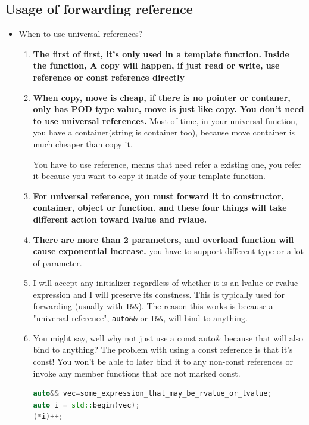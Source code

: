 \documentclass[a4paper,11pt,twoside]{book}
\begin{document}
\subsection{Usage of forwarding reference}
\begin{itemize}
\item When to use universal references? 
	\begin{enumerate}
		\item \textbf{The first of first, it's only used in a template function.}  \textbf{Inside the function, A copy will happen, if just read or write, use reference or const reference directly}
		
		\item \textbf{When copy, move is cheap, if there is no pointer or contaner, only has POD type value, move is just like copy. You don't need to use universal references.} Most of time, in your universal function, you have a container(string is container too), because move container is much cheaper than copy it. 
		
		You have to use reference, means that need refer a existing one, you refer it because you want to copy it inside of your template function. 
		
		\item \textbf{For universal reference, you must forward it to constructor, container, object or function. and these four things will take different action toward lvalue and rvlaue.}
		
		\item \textbf{There are more than 2 parameters, and overload function will cause exponential increase.} you have to support different type or a lot of parameter. 

		\item I will accept any initializer regardless of whether it is an lvalue or rvalue expression and I will preserve its constness.  This is typically used for forwarding (usually with \texttt{T\&\&}). The reason this works is because a "universal reference", \texttt{auto\&\&} or \texttt{T\&\&}, will bind to anything.  

		\item You might say, well why not just use a const auto\& because that will also bind to anything? The problem with using a const reference is that it's const! You won't be able to later bind it to any non-const references or invoke any member functions that are not marked const.
\begin{lstlisting}[frame=single, language=c++]
auto&& vec=some_expression_that_may_be_rvalue_or_lvalue;
auto i = std::begin(vec);
(*i)++;


\end{lstlisting}
\end{enumerate}
\end{itemize}
\end{document}
